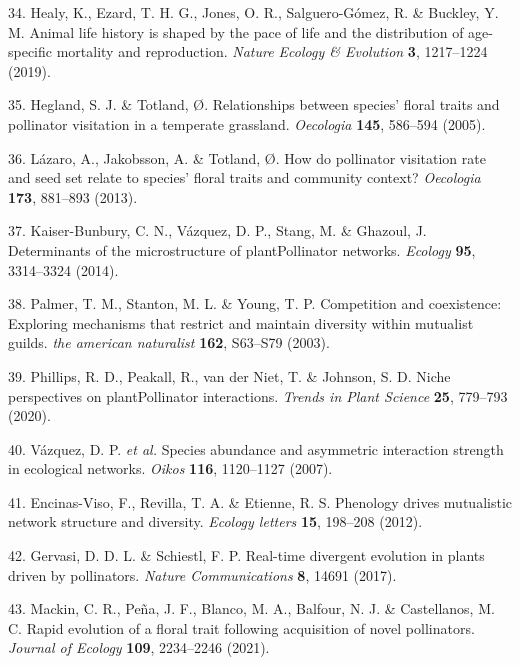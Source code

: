 \documentclass[12pt,a4paper,]{article}
\begin{document}
\hypertarget{ref-healy2019}{}
34. Healy, K., Ezard, T. H. G., Jones, O. R., Salguero-Gómez, R. \&
Buckley, Y. M. Animal life history is shaped by the pace of life and the
distribution of age-specific mortality and reproduction. \emph{Nature
Ecology \& Evolution} \textbf{3}, 1217--1224 (2019).

\hypertarget{ref-hegland2005}{}
35. Hegland, S. J. \& Totland, Ø. Relationships between species' floral
traits and pollinator visitation in a temperate grassland.
\emph{Oecologia} \textbf{145}, 586--594 (2005).

\hypertarget{ref-lazaro2013}{}
36. Lázaro, A., Jakobsson, A. \& Totland, Ø. How do pollinator
visitation rate and seed set relate to species' floral traits and
community context? \emph{Oecologia} \textbf{173}, 881--893 (2013).

\hypertarget{ref-kaiser2014}{}
37. Kaiser-Bunbury, C. N., Vázquez, D. P., Stang, M. \& Ghazoul, J.
Determinants of the microstructure of plantPollinator networks.
\emph{Ecology} \textbf{95}, 3314--3324 (2014).

\hypertarget{ref-palmer2003}{}
38. Palmer, T. M., Stanton, M. L. \& Young, T. P. Competition and
coexistence: Exploring mechanisms that restrict and maintain diversity
within mutualist guilds. \emph{the american naturalist} \textbf{162},
S63--S79 (2003).

\hypertarget{ref-phillips2020}{}
39. Phillips, R. D., Peakall, R., van der Niet, T. \& Johnson, S. D.
Niche perspectives on plantPollinator interactions. \emph{Trends in
Plant Science} \textbf{25}, 779--793 (2020).

\hypertarget{ref-vazquez2007}{}
40. Vázquez, D. P. \emph{et al.} Species abundance and asymmetric
interaction strength in ecological networks. \emph{Oikos} \textbf{116},
1120--1127 (2007).

\hypertarget{ref-encinas2012}{}
41. Encinas-Viso, F., Revilla, T. A. \& Etienne, R. S. Phenology drives
mutualistic network structure and diversity. \emph{Ecology letters}
\textbf{15}, 198--208 (2012).

\hypertarget{ref-gervasi2017}{}
42. Gervasi, D. D. L. \& Schiestl, F. P. Real-time divergent evolution
in plants driven by pollinators. \emph{Nature Communications}
\textbf{8}, 14691 (2017).

\hypertarget{ref-mackin2021}{}
43. Mackin, C. R., Peña, J. F., Blanco, M. A., Balfour, N. J. \&
Castellanos, M. C. Rapid evolution of a floral trait following
acquisition of novel pollinators. \emph{Journal of Ecology}
\textbf{109}, 2234--2246 (2021).
\end{document}
